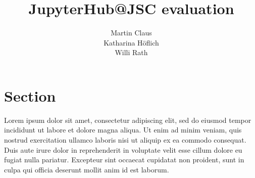 \documentclass[11pt,a4paper]{article}
\title{\textbf{JupyterHub@JSC evaluation}}
\author{Martin Claus\\ %
		    Katharina Höflich\\
		    Willi Rath}
\begin{document}
\maketitle

\section{Section}

Lorem ipsum dolor sit amet, consectetur adipiscing elit, sed do eiusmod tempor incididunt ut labore et dolore magna aliqua. Ut enim ad minim veniam, quis nostrud exercitation ullamco laboris nisi ut aliquip ex ea commodo consequat. Duis aute irure dolor in reprehenderit in voluptate velit esse cillum dolore eu fugiat nulla pariatur. Excepteur sint occaecat cupidatat non proident, sunt in culpa qui officia deserunt mollit anim id est laborum. \citep{Lorem2020a}


\end{document}
